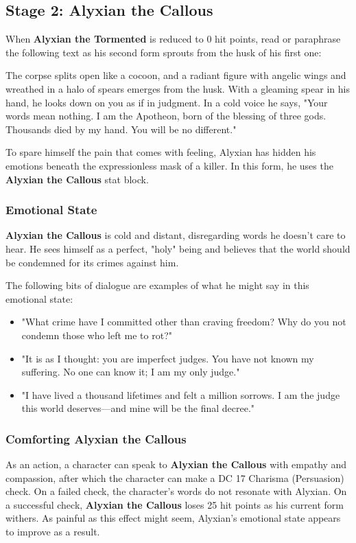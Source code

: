 \documentclass[10pt,a4paper,twoside,bg=print,twocolumn,openany,nodeprecatedcode]{dndbook}
\begin{document}
\subsection{Stage 2: Alyxian the Callous}
When \textbf{Alyxian the Tormented} is reduced to 0 hit points, read or paraphrase the following text as his second form sprouts from the husk of his first one:

\begin{DndReadAloud}{}
The corpse splits open like a cocoon, and a radiant figure with angelic wings and wreathed in a halo of spears emerges from the husk. With a gleaming spear in his hand, he looks down on you as if in judgment. In a cold voice he says, "Your words mean nothing. I am the Apotheon, born of the blessing of three gods. Thousands died by my hand. You will be no different."

\end{DndReadAloud}

To spare himself the pain that comes with feeling, Alyxian has hidden his emotions beneath the expressionless mask of a killer. In this form, he uses the \textbf{Alyxian the Callous} stat block.

\subsubsection{Emotional State}
\textbf{Alyxian the Callous} is cold and distant, disregarding words he doesn't care to hear. He sees himself as a perfect, "holy" being and believes that the world should be condemned for its crimes against him.

The following bits of dialogue are examples of what he might say in this emotional state:


\begin{itemize}
\item "What crime have I committed other than craving freedom? Why do you not condemn those who left me to rot?"
\item "It is as I thought: you are imperfect judges. You have not known my suffering. No one can know it; I am my only judge."
\item "I have lived a thousand lifetimes and felt a million sorrows. I am the judge this world deserves—and mine will be the final decree."
\end{itemize}

\subsubsection{Comforting Alyxian the Callous}
As an action, a character can speak to \textbf{Alyxian the Callous} with empathy and compassion, after which the character can make a DC 17 Charisma (Persuasion) check. On a failed check, the character's words do not resonate with Alyxian. On a successful check, \textbf{Alyxian the Callous} loses 25 hit points as his current form withers. As painful as this effect might seem, Alyxian's emotional state appears to improve as a result.
\end{document}
